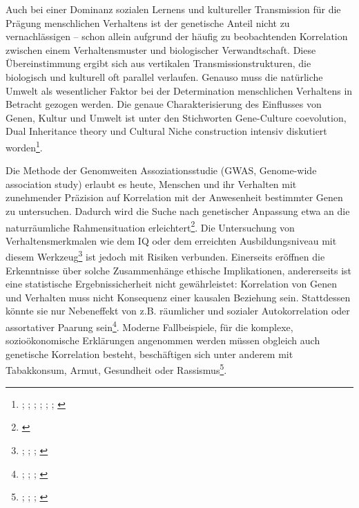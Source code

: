 \documentclass[openany,twoside,twocolumn]{book}
\let\rmarkdownfootnote\footnote%
\def\footnote{\protect\rmarkdownfootnote}
\begin{document}
Auch bei einer Dominanz sozialen Lernens und kultureller Transmission
für die Prägung menschlichen Verhaltens ist der genetische Anteil nicht
zu vernachlässigen -- schon allein aufgrund der häufig zu beobachtenden
Korrelation zwischen einem Verhaltensmuster und biologischer
Verwandtschaft. Diese Übereinstimmung ergibt sich aus vertikalen
Transmissionstrukturen, die biologisch und kulturell oft parallel
verlaufen. Genauso muss die natürliche Umwelt als wesentlicher Faktor
bei der Determination menschlichen Verhaltens in Betracht gezogen
werden. Die genaue Charakterisierung des Einflusses von Genen, Kultur
und Umwelt ist unter den Stichworten Gene-Culture coevolution, Dual
Inheritance theory und Cultural Niche construction intensiv diskutiert
worden\footnote{\textcite{aoki_gene-culture_2017};
  \textcite{boyd_culture_1985}; \textcite{cavalli-sforza_cultural_1981};
  \textcite{chudek_culturegene_2011}; \textcite{feldman_aspects_1979};
  \textcite{mesoudi_towards_2006}; \textcite{richerson_dual_1978}}.

Die Methode der Genomweiten Assoziationsstudie (GWAS, Genome-wide
association study) erlaubt es heute, Menschen und ihr Verhalten mit
zunehmender Präzision auf Korrelation mit der Anwesenheit bestimmter
Genen zu untersuchen. Dadurch wird die Suche nach genetischer Anpassung
etwa an die naturräumliche Rahmensituation erleichtert\footnote{\textcite{berg_population_2014}}.
Die Untersuchung von Verhaltensmerkmalen wie dem IQ oder dem erreichten
Ausbildungsniveau mit diesem Werkzeug\footnote{\textcite{benyamin_childhood_2014};
  \textcite{davies_genome-wide_2011}; \textcite{minkov_genetic_2015};
  \textcite{okbay_genome-wide_2016}} ist jedoch mit Risiken verbunden.
Einerseits eröffnen die Erkenntnisse über solche Zusammenhänge ethische
Implikationen, andererseits ist eine statistische Ergebnissicherheit
nicht gewährleistet: Korrelation von Genen und Verhalten muss nicht
Konsequenz einer kausalen Beziehung sein. Stattdessen könnte sie nur
Nebeneffekt von z.B. räumlicher und sozialer Autokorrelation oder
assortativer Paarung sein\footnote{\textcite{abdellaoui_educational_2015};
  \textcite{domingue_genetic_2014}; \textcite{okbay_genome-wide_2016};
  \textcite{piffer_review_2015}}. Moderne Fallbeispiele, für die
komplexe, sozioökonomische Erklärungen angenommen werden müssen obgleich
auch genetische Korrelation besteht, beschäftigen sich unter anderem mit
Tabakkonsum, Armut, Gesundheit oder Rassismus\footnote{\textcite{maes_genetic_2006};
  \textcite{marden_african_2016};
  \textcite{nugent_geneenvironment_2011};
  \textcite{paradies_racism_2015}}.
\end{document}
